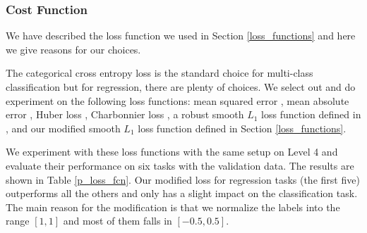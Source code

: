 \subsubsection{Cost Function}

We have described the loss function we used in Section \ref{loss_functions} and here we give reasons for our choices.

The categorical cross entropy loss is the standard choice for multi-class classification but for regression, there are plenty of choices. We select out and do experiment on the following loss functions:  mean squared error \cite{4775883}, mean absolute error \cite{2005ClRes3079W}, Huber loss \cite{huber1964}, Charbonnier loss \cite{413553},  a robust smooth $L_1$ loss function defined in \cite{DBLP:journals/corr/Girshick15}, and our modified smooth $L_1$ loss function defined in Section \ref{loss_functions}.

We experiment with these loss functions with the same setup on Level 4 and evaluate their performance on six tasks with the validation data. The results are shown in Table \ref{p_loss_fcn}. Our modified loss for regression tasks (the first five) outperforms all the others and only has a slight impact on the classification task. The main reason for the modification is that we normalize the labels into the range $[1, 1]$ and most of them falls in $[-0.5, 0.5]$. 

